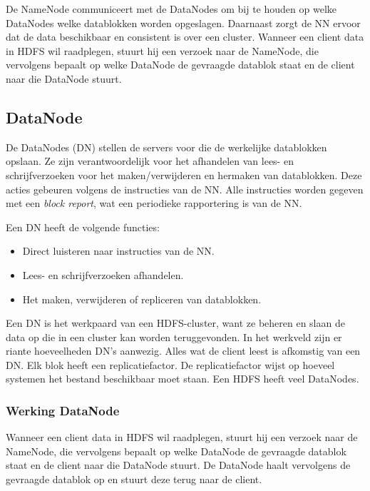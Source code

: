 \documentclass[a4paper,10pt,twoside]{report}
\begin{document}
De NameNode communiceert met de DataNodes om bij te houden op welke DataNodes welke datablokken worden opgeslagen. Daarnaast zorgt de NN ervoor dat de data beschikbaar en consistent is over een cluster. Wanneer een client data in HDFS wil raadplegen, stuurt hij een verzoek naar de NameNode, die vervolgens bepaalt op welke DataNode de gevraagde datablok staat en de client naar die DataNode stuurt.

\subsection{DataNode}

De DataNodes (DN) stellen de servers voor die de werkelijke datablokken opslaan. Ze zijn verantwoordelijk voor het afhandelen van lees- en schrijfverzoeken voor het maken/verwijderen en hermaken van datablokken. Deze acties gebeuren volgens de instructies van de NN. Alle instructies worden gegeven met een \textit{block report}, wat een periodieke rapportering is van de NN.

Een DN heeft de volgende functies:

\begin{itemize}
	\item Direct luisteren naar instructies van de NN.
	\item Lees- en schrijfverzoeken afhandelen.
	\item Het maken, verwijderen of repliceren van datablokken.
\end{itemize}

Een DN is het werkpaard van een HDFS-cluster, want ze beheren en slaan de data op die in een cluster kan worden teruggevonden. In het werkveld zijn er riante hoeveelheden DN's aanwezig. Alles wat de client leest is afkomstig van een DN. Elk blok heeft een replicatiefactor. De replicatiefactor wijst op hoeveel systemen het bestand beschikbaar moet staan. Een HDFS heeft veel DataNodes.

\subsubsection{Werking DataNode}

Wanneer een client data in HDFS wil raadplegen, stuurt hij een verzoek naar de NameNode, die vervolgens bepaalt op welke DataNode de gevraagde datablok staat en de client naar die DataNode stuurt. De DataNode haalt vervolgens de gevraagde datablok op en stuurt deze terug naar de client.
\end{document}
